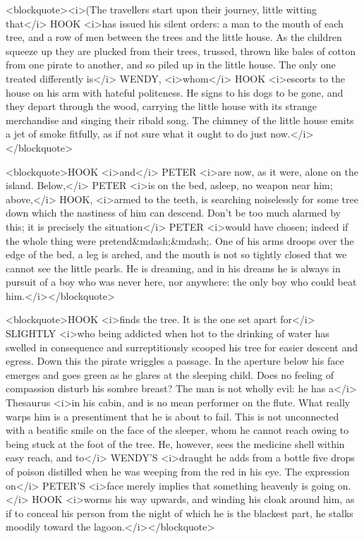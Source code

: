 <blockquote><i>(The travellers start upon their journey, little
witting that</i> HOOK <i>has issued his silent orders: a man to the
mouth of each tree, and a row of men between the trees and the little
house. As the children squeeze up they are plucked from their trees,
trussed, thrown like bales of cotton from one pirate to another, and
so piled up in the little house. The only one treated differently
is</i> WENDY, <i>whom</i> HOOK <i>escorts to the house on his arm
with hateful politeness. He signs to his dogs to be gone, and they
depart through the wood, carrying the little house with its strange
merchandise and singing their ribald song. The chimney of the little
house emits a jet of smoke fitfully, as if not sure what it ought to
do just now.</i></blockquote>

<blockquote>HOOK <i>and</i> PETER <i>are now, as it were, alone on
the island. Below,</i> PETER <i>is on the bed, asleep, no weapon near
him; above,</i> HOOK, <i>armed to the teeth, is searching noiselessly
for some tree down which the nastiness of him can descend. Don't be
too much alarmed by this; it is precisely the situation</i> PETER
<i>would have chosen; indeed if the whole thing were
pretend&mdash;&mdash;. One of his arms droops over the edge of the
bed, a leg is arched, and the mouth is not so tightly closed that we
cannot see the little pearls. He is dreaming, and in his dreams he is
always in pursuit of a boy who was never here, nor anywhere: the only
boy who could beat him.</i></blockquote>

<blockquote>HOOK <i>finds the tree. It is the one set apart for</i>
SLIGHTLY <i>who being addicted when hot to the drinking of water has
swelled in consequence and surreptitiously scooped his tree for
easier descent and egress. Down this the pirate wriggles a passage.
In the aperture below his face emerges and goes green as he glares at
the sleeping child. Does no feeling of compassion disturb his sombre
breast? The man is not wholly evil: he has a</i> Thesaurus <i>in his
cabin, and is no mean performer on the flute. What really warps him
is a presentiment that he is about to fail. This is not unconnected
with a beatific smile on the face of the sleeper, whom he cannot
reach owing to being stuck at the foot of the tree. He, however, sees
the medicine shell within easy reach, and to</i> WENDY'S <i>draught
he adds from a bottle five drops of poison distilled when he was
weeping from the red in his eye. The expression on</i> PETER'S
<i>face merely implies that something heavenly is going on.</i> HOOK
<i>worms his way upwards, and winding his cloak around him, as if to
conceal his person from the night of which he is the blackest part,
he stalks moodily toward the lagoon.</i></blockquote>

